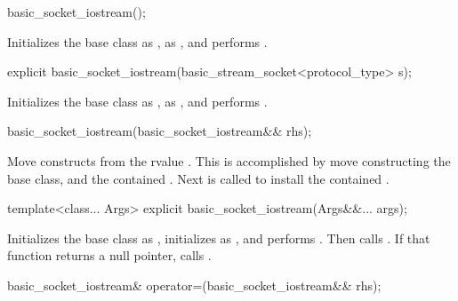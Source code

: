 \begin{itemdecl}
basic_socket_iostream();
\end{itemdecl}

\begin{itemdescr}
\pnum
\effects Initializes the base class as ,  as , and performs .
\end{itemdescr}

\begin{itemdecl}
explicit basic_socket_iostream(basic_stream_socket<protocol_type> s);
\end{itemdecl}

\begin{itemdescr}
\pnum
\effects Initializes the base class as ,  as , and performs .
\end{itemdescr}

\begin{itemdecl}
basic_socket_iostream(basic_socket_iostream&& rhs);
\end{itemdecl}

\begin{itemdescr}
\pnum
\effects Move constructs from the rvalue . This is accomplished by move constructing the base class, and the contained . Next  is called to install the contained .
\end{itemdescr}

\begin{itemdecl}
template<class... Args>
  explicit basic_socket_iostream(Args&&... args);
\end{itemdecl}

\begin{itemdescr}
\pnum
\effects Initializes the base class as , initializes  as , and performs . Then calls . If that function returns a null pointer, calls .
\end{itemdescr}

\begin{itemdecl}
basic_socket_iostream& operator=(basic_socket_iostream&& rhs);
\end{itemdecl}

